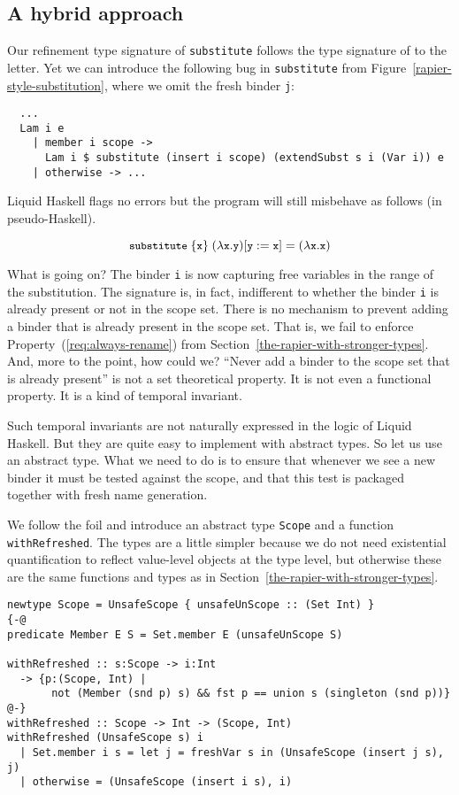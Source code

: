 \documentclass[sigconf, review]{acmart}
\newcommand{\tc}[1]{{\small\texttt{#1}}}
\newcommand{\codeblocksize}{\fontsize{6.5}{9}\selectfont}
\begin{document}
\subsection{A hybrid approach}
\label{ensuring-the-scope-set-is-checked}

Our refinement type signature of \tc{substitute} follows the type signature of
\citeauthor{maclaurin23} to the letter.
Yet we can introduce the following bug in \tc{substitute} from
Figure~\ref{rapier-style-substitution}, where we omit the fresh binder \tc{j}:
\begin{verbatim}
  ...
  Lam i e
    | member i scope ->
      Lam i $ substitute (insert i scope) (extendSubst s i (Var i)) e
    | otherwise -> ...
\end{verbatim}
Liquid Haskell flags no errors but the program will still misbehave as
follows (in pseudo-Haskell).

$$\codeblocksize{\tc{substitute}~\{\tc{x}\}~(\lambda{}\tc{x}. \tc{y}) [\tc{y}:=\tc{x}] = (\lambda{}\tc{x}. \tc{x})}$$

What is going on? The binder \tc{i} is now capturing free variables in the
range of the substitution. The signature is, in fact, indifferent to whether
the binder \tc{i} is already present or not in the scope set. There is no
mechanism to prevent adding a binder that is already present in the scope set.
That is, we fail to enforce Property~(\ref{req:always-rename}) from Section~\ref{the-rapier-with-stronger-types}.
And, more to the point, how could we? “Never add a binder to the scope set that is already
present” is not a set theoretical property. It is not even a functional property.
It is a kind of temporal invariant.

Such temporal invariants are not naturally expressed in the logic of Liquid Haskell.
But they are quite easy to implement with abstract types. So let us use an abstract
type. What we need to do is to ensure that whenever we see a new binder it must
be tested against the scope, and that this test is packaged together with fresh
name generation.

We follow the foil and
introduce an abstract type \tc{Scope} and a function \tc{withRefreshed}. The types are a little
simpler because we do not need existential quantification to reflect value-level
objects at the type level, but otherwise these are the same functions and types
as in Section~\ref{the-rapier-with-stronger-types}.
\begin{verbatim}
newtype Scope = UnsafeScope { unsafeUnScope :: (Set Int) }
{-@
predicate Member E S = Set.member E (unsafeUnScope S)

withRefreshed :: s:Scope -> i:Int
  -> {p:(Scope, Int) |
       not (Member (snd p) s) && fst p == union s (singleton (snd p))}
@-}
withRefreshed :: Scope -> Int -> (Scope, Int)
withRefreshed (UnsafeScope s) i
  | Set.member i s = let j = freshVar s in (UnsafeScope (insert j s), j)
  | otherwise = (UnsafeScope (insert i s), i)
\end{verbatim}
\end{document}
